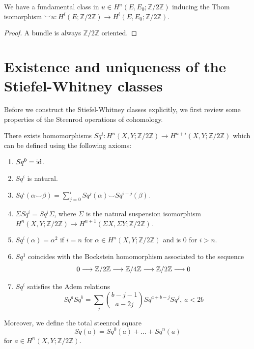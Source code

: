 	\begin{coro}
		We have a fundamental class in $u\in H^n(E,E_0;\mathbb{Z}/2\mathbb{Z})$ inducing the Thom isomorphism $\smile u:H^i(E;\mathbb{Z}/2\mathbb{Z})\to H^i(E,E_0;\mathbb{Z}/2\mathbb{Z})$. 
	\end{coro}
	\begin{proof}
		A bundle is always $\mathbb{Z}/2\mathbb{Z}$ oriented. 
	\end{proof}

\section{Existence and uniqueness of the Stiefel-Whitney classes}
	
	Before we construct the Stiefel-Whitney classes explicitly, we first review some properties of the Steenrod operations of cohomology. 
	\begin{thm} \label{Steenrod_op}
		There exists homomorphisms $Sq^i:H^n(X,Y;\mathbb{Z}/2\mathbb{Z})\to H^{n+i}(X,Y;\mathbb{Z}/2\mathbb{Z})$ which can be defined using the following axioms: 
		\begin{enumerate}
			\item $Sq^0=\operatorname{\mathrm{id}}$. 
			\item $Sq^i$ is natural. 
			\item $Sq^i(\alpha\smile\beta)=\sum_{j=0}^i Sq^j(\alpha)\smile Sq^{i-j}(\beta)$. 
			\item $\Sigma Sq^i=Sq^i\Sigma$, where $\Sigma$ is the natural suspension isomorphism \\
			$H^n(X,Y;\mathbb{Z}/2\mathbb{Z})\to H^{n+1}(\Sigma X,\Sigma Y;\mathbb{Z}/2\mathbb{Z})$. 
			\item $Sq^i(\alpha)=\alpha^2$ if $i=n$ for $\alpha\in H^n(X,Y;\mathbb{Z}/2\mathbb{Z})$ and is $0$ for $i>n$. 
			\item $Sq^1$ coincides with the Bockstein homomorphism associated to the sequence
			\[ 0\longrightarrow \mathbb{Z}/2\mathbb{Z}\longrightarrow \mathbb{Z}/4\mathbb{Z}\longrightarrow \mathbb{Z}/2\mathbb{Z}\longrightarrow 0 \]
			\item $Sq^i$ satisfies the Adem relations
			\[ Sq^a Sq^b=\sum_j\binom{b-j-1}{a-2j}Sq^{a+b-j}Sq^j,~a<2b \]
		\end{enumerate}
		Moreover, we define the total steenrod square 
		\[ Sq(a)=Sq^0(a)+\dots+Sq^n(a) \] 
		for $a\in H^n(X,Y;\mathbb{Z}/2\mathbb{Z})$. 
	\end{thm}

